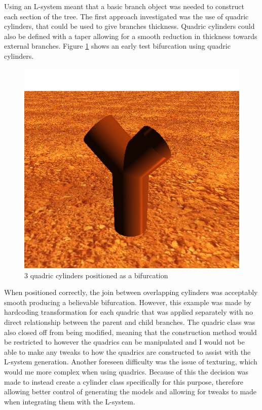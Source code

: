 \documentclass[final]{cmpreport}
\begin{document}
Using an L-system meant that a basic branch object was needed to construct each section of the 
tree. The first approach investigated was the use of quadric cylinders, that could be 
used to give branches thickness. Quadric cylinders could also be defined with a taper allowing 
for a smooth reduction in thickness towards external branches. Figure \ref{fig:quadric-cylinders} shows 
an early test bifurcation using quadric cylinders.

\begin{figure}[ht]
    \includegraphics[scale=0.5]{quadric-cylinders.png} 
    \centering
    \captionsetup{justification=centering}
    \caption{3 quadric cylinders positioned as a bifurcation}
    \label{fig:quadric-cylinders}
\end{figure}

When positioned correctly, the join between 
overlapping cylinders was acceptably smooth producing a believable bifurcation. However, this 
example was made by hardcoding transformation for each quadric that was applied separately with 
no direct relationship between the parent and child branches. The quadric class was also closed 
off from being modified, meaning that the construction method would be restricted to however the 
quadrics can be manipulated and I would not be able to make any tweaks to how the quadrics are 
constructed to assist with the L-system generation. Another foreseen difficulty was the issue of
texturing, which would me more complex when using quadrics.
Because of this the decision was made to instead create a cylinder class specifically for this 
purpose, therefore allowing better control of generating the models and allowing for tweaks to 
made when integrating them with the L-system. 
\end{document}
